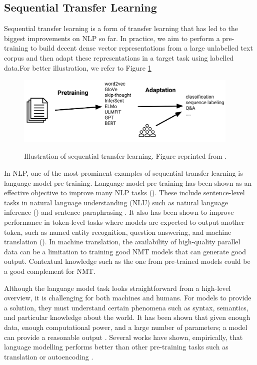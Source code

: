 \subsection{Sequential Transfer Learning}
Sequential transfer learning is a form of transfer learning that has led to the biggest improvements on NLP so far. In practice, we aim to perform a pre-training to build decent dense vector representations from a large unlabelled text corpus and then adapt these representations in a target task using labelled data.For better illustration, we refer to Figure \ref{img:seq_tl}

\begin{figure}[h]
    {\includegraphics[width=0.95\textwidth]{img/sequential_tl.png}}
    \centering
    \caption{Illustration of sequential transfer learning. Figure reprinted from \cite{ruder2019transfer}.}
    \label{img:seq_tl}
\end{figure}

In NLP, one of the most prominent examples of sequential transfer learning is language model pre-training. Language model pre-training has been shown as an effective objective to improve many NLP tasks (\cite{Dai2015SemisupervisedSL,Peters2018DeepCW,Radford2018ImprovingLU,Howard2018UniversalLM}). These include sentence-level tasks in natural language understanding (NLU) such as natural language inference (\cite{Bowman2015ALA,Williams2018ABC}) and sentence paraphrasing \cite{Dolan2005AutomaticallyCA}. It also has been shown to improve performance in token-level tasks where models are expected to output another token, such as named entity recognition, question answering, and machine translation (\cite{Sang2003IntroductionTT,Rajpurkar2016SQuAD1Q}). In machine translation, the availability of high-quality parallel data can be a limitation to training good NMT models that can generate good output. Contextual knowledge such as the one from pre-trained models could be a good complement for NMT.

Although the language model task looks straightforward from a high-level overview, it is challenging for both machines and humans. For models to provide a solution, they must understand certain phenomena such as syntax, semantics, and particular knowledge about the world. It has been shown that given enough data, enough computational power, and a large number of parameters; a model can provide a reasonable output \cite{radford2018improving}. Several works have shown, empirically, that language modelling performs better than other pre-training tasks such as translation or autoencoding \cite{Zhang2018LanguageMT,Wang2019CanYT}.

